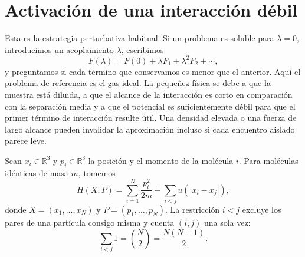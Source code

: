 \section{Activación de una interacción débil}

\begin{classroomqa}\end{classroomqa}

Esta es la estrategia perturbativa habitual. Si un problema es soluble para \(\lambda=0\), introducimos un acoplamiento \(\lambda\), escribimos \begin{equation}
 F(\lambda)=F(0)+\lambda F_1+\lambda^2F_2+\cdots,
 \label{eq:sm6-perturbative-template}
\end{equation} y preguntamos si cada término que conservamos es menor que el anterior. Aquí el problema de referencia es el gas ideal. La pequeñez física se debe a que la muestra está diluida, a que el alcance de la interacción es corto en comparación con la separación media y a que el potencial es suficientemente débil para que el primer término de interacción resulte útil. Una densidad elevada o una fuerza de largo alcance pueden invalidar la aproximación incluso si cada encuentro aislado parece leve.

Sean \(x_i\in\mathbb R^3\) y \(p_i\in\mathbb R^3\) la posición y el momento de la molécula \(i\). Para moléculas idénticas de masa \(m\), tomemos \begin{equation}
 H(X,P)=
 \sum_{i=1}^{N}\frac{p_i^2}{2m}
 +\sum_{i<j}u\!\left(|x_i-x_j|\right),
 \label{eq:sm6-interacting-hamiltonian}
\end{equation} donde \(X=(x_1,\ldots,x_N)\) y \(P=(p_1,\ldots,p_N)\). La restricción \(i<j\) excluye los pares de una partícula consigo misma y cuenta \((i,j)\) una sola vez: \begin{equation}
 \sum_{i<j}1=\binom{N}{2}=\frac{N(N-1)}{2}.
 \label{eq:sm6-pair-count}
\end{equation}

\begin{classroomqa}\end{classroomqa}


